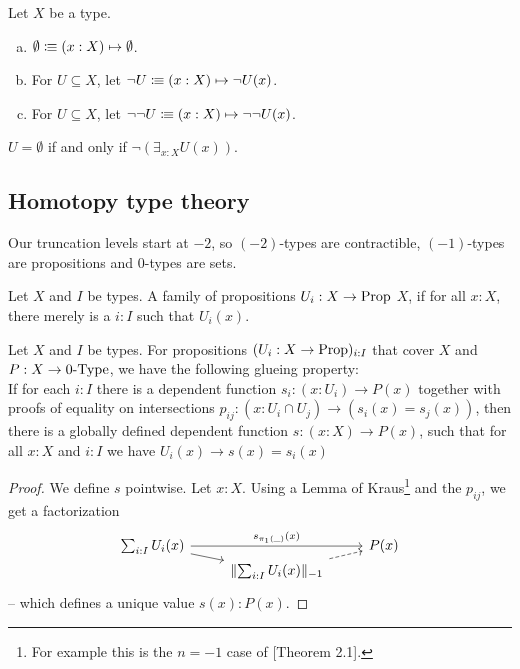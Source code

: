 \begin{definition}
  Let $X$ be a type.
  \begin{enumerate}[(a)]
  \item $\emptyset\vcentcolon\mspace{-1.2mu}\equiv (x:X)\mapsto \emptyset$. \index{$\emptyset$}
  \item For $U\subseteq X$, let $\neg U\vcentcolon\mspace{-1.2mu}\equiv (x:X)\mapsto \neg U(x)$. 
  \item For $U\subseteq X$, let $\neg\neg U\vcentcolon\mspace{-1.2mu}\equiv (x:X)\mapsto \neg\neg U(x)$. 
  \end{enumerate}
\end{definition}

\begin{lemma}
  $U=\emptyset$ if and only if $\neg\left(\exists_{x:X}U(x)\right)$.
\end{lemma}

\subsection{Homotopy type theory}

Our truncation levels start at $-2$, so $(-2)$-types are contractible, $(-1)$-types are propositions and $0$-types are sets.

\begin{definition}%
  Let $X$ and $I$ be types.
  A family of propositions $U_i:X\to\mathrm{Prop}$  $X$,
  if for all $x:X$, there merely is a $i:I$ such that $U_i(x)$.
\end{definition}

\begin{lemma}%
  \label{kraus-glueing}
  Let $X$ and $I$ be types.
  For propositions $(U_i:X \to \mathrm{Prop})_{i:I}$ that cover $X$ and $P:X\to 0\mbox{-}\mathrm{Type}$, we have the following glueing property: \\
  If for each $i:I$ there is a dependent function $s_i:(x:U_i)\to P(x)$ together with
  proofs of equality on intersections $p_{ij}:(x:U_i\cap U_j)\to (s_i(x)=s_j(x))$,
  then there is a globally defined dependent function $s:(x:X) \to P(x)$,
  such that for all $x:X$ and $i:I$ we have $U_i(x) \to s(x)=s_i(x)$
\end{lemma}

\begin{proof}
  We define $s$ pointwise.
  Let $x:X$.
  Using a Lemma of Kraus\footnote{For example this is the $n=-1$ case of \cite{dagstuhl-kraus}[Theorem 2.1].}
  and the $p_{ij}$, we get a factorization
  \[ \begin{tikzcd}[row sep=0mm]
    \sum_{i:I} U_i(x) \ar[rr, "s_{\pi_1(\_)}(x)"]\ar[rd] & & P(x) \\
    & \propTrunc{\sum_{i:I} U_i(x)}_{-1}\ar[ru,dashed] &
  \end{tikzcd} \]
-- which defines a unique value $s(x):P(x)$.
\end{proof}

